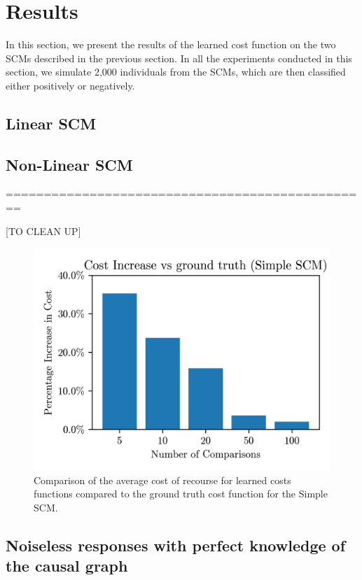 \section{Results}

In this section, we present the results of the learned cost function on the two SCMs described in the previous section. In all the experiments conducted in this section, we simulate 2,000 individuals from the SCMs, which are then classified either positively or negatively.

\subsection{Linear SCM}



\subsection{Non-Linear SCM}



================================================

[TO CLEAN UP]

\begin{figure}[!htb]
	\centering
	\includegraphics[scale=1]{images/simpleSCM_comparison_results.png}
	\caption{Comparison of the average cost of recourse for learned costs functions compared to the ground truth cost function for the Simple SCM.}
	\label{fig:simple_scm}
\end{figure}


\subsection{Noiseless responses with perfect knowledge of the causal graph}

